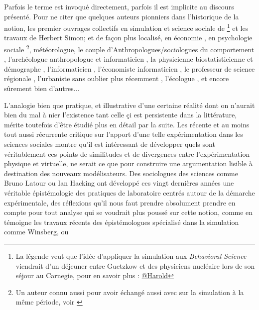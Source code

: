Parfois le terme est invoqué directement, parfois il est implicite au discours présenté. Pour ne citer que quelques auteurs pionniers dans l'historique de la notion, les premier ouvrages collectifs en simulation et science sociale de \textcite{Guetzkow1962, Guetzkow1972} \footnote{La légende veut que l'idée d'appliquer la simulation aux \textit{Behavioral Science} viendrait d'un déjeuner entre Guetzkow et des physiciens nucléaire lors de son séjour au Carnegie, pour en savoir plus : \href{http://www.hawaii.edu/intlrel/pols635f/Guetzkow/hg.html}{@Harold} } et les travaux de Herbert Simon; et de façon plus localisé, en économie \textcite[915]{Shubik1960b}, en psychologie sociale \textcite{Abelson1968} \footnote{Un auteur connu aussi pour avoir échangé aussi avec \textcite{Boudon1967} sur la simulation à la même période, voir  \textcite{Padioleau1969}}, \textcite{Fleisher1965} météorologue, le couple d'Anthropologues/sociologues du comportement \textcite{Gullahorn1965}, l'archéologue anthropologue et informaticien \textcite{Doran1970}, la physicienne biostatisticienne et démographe \textcite{Sheps1971}, l'informaticien \textcite[3-4]{Forrester1971}, l'économiste informaticien \textcite{Naylor1966}, le professeur de science régionale \textcite[271]{Harris1966}, l'urbaniste \textcite[295]{Batty1976} sans oublier plus récemment \textcite{Epstein1996}, l'écologue \textcite{Grimm2006}, et encore sûrement bien d'autres...

L'analogie bien que pratique, et illustrative d'une certaine réalité dont on n'aurait bien du mal à nier l'existence tant celle çi est persistente dans la littérature, mérite toutefois d'être étudié plus en détail par la suite. Les récente et au moins tout aussi récurrente critique sur l'apport d'une telle expérimentation dans les sciences sociales montre qu'il est intéressant de développer quels sont véritablement ces points de similitudes et de divergences entre l'expérimentation physique et virtuelle, ne serait ce que pour construire une argumentation lisible à destination des nouveaux modélisateurs. Des sociologues des sciences comme Bruno Latour ou Ian Hacking ont développé ces vingt dernières années une véritable épistémologie des pratiques de laboratoire centrés autour de la démarche expérimentale, des réflexions qu'il nous faut prendre absolument prendre en compte pour tout analyse qui se voudrait plus poussé sur cette notion, comme en témoigne les travaux récents des épistémologues spécialisé dans la simulation comme Winsberg, ou \textcite[204]{Varenne2012}

